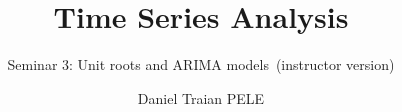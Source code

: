 \title[Time Series Analysis]{Time Series Analysis}
\subtitle{Seminar 3: Unit roots and ARIMA models\ifsolutions\ (instructor version)\fi}
\author[D.T. Pele]{Daniel Traian PELE}
\date{}

\providecommand{\tsaapplink}[3]{\hypertarget{#2}{}\hyperlink{#1}{\beamergotobutton{#3}}}  %
\providecommand{\tsaappback}[2]{\begin{tikzpicture}[remember picture,overlay]\node[anchor=south east] at ([xshift=-3mm,yshift=7mm]current page.south east){\hyperlink{#1}{\beamerreturnbutton{#2}}};\end{tikzpicture}}  %
\providecommand{\tsachlink}[2]{\href{#1}{#2}}  %
\providecommand{\tsachlinkt}[2]{\href{#1}{\usebeamercolor[fg]{frametitle}#2}}  %


